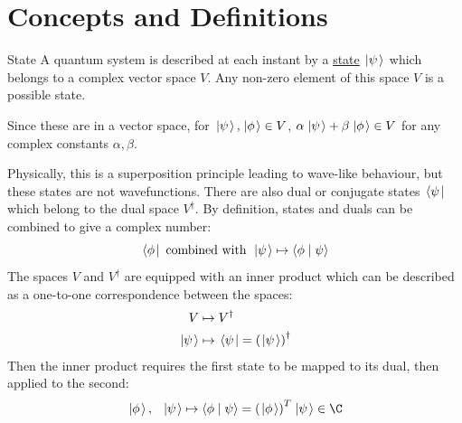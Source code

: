 \documentclass[../Main.tex]{subfiles}
\begin{document}
\section{Concepts and Definitions}
\begin{definition}{State}
    A quantum system is described at each instant by a \underline{state} $\left.\left|\psi\right.\right\rangle$ which belongs to a complex vector space $V$. Any non-zero element of this space $V$ is a possible state.
\end{definition}
Since these are in a vector space, for $\left.\left|\psi\right.\right\rangle, \left.\left|\phi\right.\right\rangle \in V$, $\alpha \left.\left|\psi\right.\right\rangle + \beta \left.\left|\phi\right.\right\rangle \in V$ for any complex constants $\alpha, \beta$.

Physically, this is a superposition principle leading to wave-like behaviour, but these states are not wavefunctions. There are also dual or conjugate states $\left.\left\langle\psi\right.\right|$ which belong to the dual space $V^\dagger$. By definition, states and duals can be combined to give a complex number:
\begin{equation*}
    \left.\left\langle\phi\right.\right| \text{ combined with }\left.\left|\psi\right.\right\rangle \mapsto \langle\phi\mid\psi\rangle
\end{equation*}
The spaces $V$ and $V^\dagger$ are equipped with an inner product which can be described as a one-to-one correspondence between the spaces:
\begin{align*}
    V &\mapsto V^\dagger \\
    \left.\left|\psi\right.\right\rangle &\mapsto \left.\left\langle\psi\right.\right| = \left(\left.\left|\psi\right.\right\rangle\right)^\dagger
\end{align*}
Then the inner product requires the first state to be mapped to its dual, then applied to the second:
\begin{equation*}
    \ket{\phi},~~\state \mapsto \inn\phi\psi = \left(\ket{\phi}\right)^T \state \in \C
\end{equation*}
\end{document}
